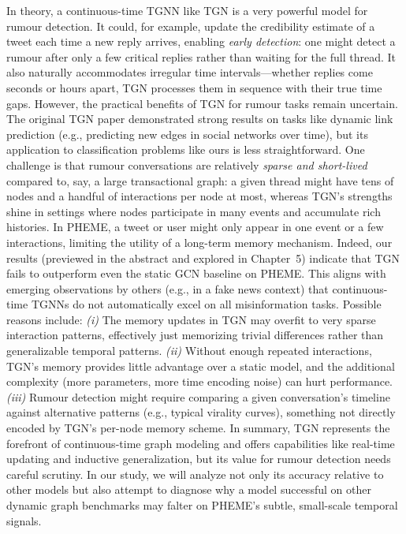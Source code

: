 \documentclass{cshonours}
\begin{document}
In theory, a continuous-time TGNN like TGN is a very powerful model for rumour detection. It could, for example, update the credibility estimate of a tweet each time a new reply arrives, enabling \emph{early detection}: one might detect a rumour after only a few critical replies rather than waiting for the full thread. It also naturally accommodates irregular time intervals—whether replies come seconds or hours apart, TGN processes them in sequence with their true time gaps. However, the practical benefits of TGN for rumour tasks remain uncertain. The original TGN paper demonstrated strong results on tasks like dynamic link prediction (e.g., predicting new edges in social networks over time), but its application to classification problems like ours is less straightforward. One challenge is that rumour conversations are relatively \emph{sparse and short-lived} compared to, say, a large transactional graph: a given thread might have tens of nodes and a handful of interactions per node at most, whereas TGN’s strengths shine in settings where nodes participate in many events and accumulate rich histories. In PHEME, a tweet or user might only appear in one event or a few interactions, limiting the utility of a long-term memory mechanism. Indeed, our results (previewed in the abstract and explored in Chapter~5) indicate that TGN fails to outperform even the static GCN baseline on PHEME. This aligns with emerging observations by others (e.g., \cite{song2021dynamic} in a fake news context) that continuous-time TGNNs do not automatically excel on all misinformation tasks. Possible reasons include: \textit{(i)} The memory updates in TGN may overfit to very sparse interaction patterns, effectively just memorizing trivial differences rather than generalizable temporal patterns. \textit{(ii)} Without enough repeated interactions, TGN’s memory provides little advantage over a static model, and the additional complexity (more parameters, more time encoding noise) can hurt performance. \textit{(iii)} Rumour detection might require comparing a given conversation’s timeline against alternative patterns (e.g., typical virality curves), something not directly encoded by TGN’s per-node memory scheme. In summary, TGN represents the forefront of continuous-time graph modeling and offers capabilities like real-time updating and inductive generalization, but its value for rumour detection needs careful scrutiny. In our study, we will analyze not only its accuracy relative to other models but also attempt to diagnose why a model successful on other dynamic graph benchmarks may falter on PHEME’s subtle, small-scale temporal signals.
\end{document}
